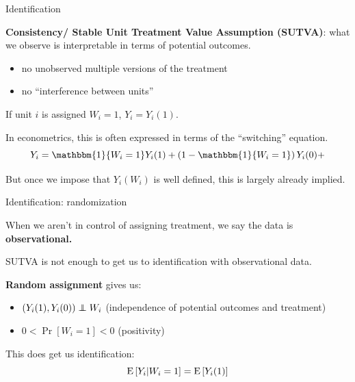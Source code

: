 \documentclass[xcolor={dvipsnames}, handout]{beamer}
\begin{document}
\begin{frame}{Identification}

\begin{wideitemize}
\item \textbf{Consistency/ Stable Unit Treatment Value Assumption (SUTVA)}: what we observe is interpretable in terms of potential outcomes. \pause
\begin{itemize}
\item no unobserved multiple versions of the treatment
\item no ``interference between units''\pause
\end{itemize}
\item If unit $i$ is assigned $W_i = 1$, $Y_i = Y_i(1)$. \pause
\item In econometrics, this is often expressed in terms of the ``switching'' equation.
\[
Y_i = \mathbbm{1}\{W_i = 1 \}Y_i(1) + \left(1- \mathbbm{1}\{W_i = 1 \}\right) Y_i(0) + 
\]\pause
\item But once we impose that $Y_i(W_i)$ is well defined, this is largely already implied. 
\end{wideitemize}



\end{frame}



\begin{frame}{Identification: randomization}

\begin{wideitemize}
\item When we aren't in control of assigning treatment, we say the data is \textbf{observational.}\pause
\item SUTVA is not enough to get us to identification with observational data. \pause
\item \textbf{Random assignment} gives us:  \pause
\begin{itemize}
\item $(Y_i(1), Y_i(0)) \independent W_i$ (independence of potential outcomes and treatment)
\item $0< \Pr[W_i = 1] <0$ (positivity)\pause
\end{itemize}
\item This does get us identification:
\[
{\textrm E}\,[Y_i | W_i = 1] = {\textrm E}\,[Y_i(1)]
\]
\end{wideitemize}

\end{frame}
\end{document}
